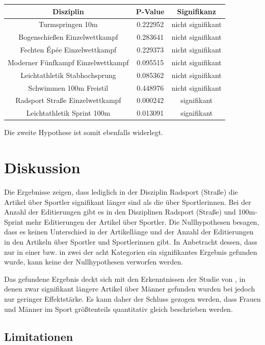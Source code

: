 \documentclass[11pt]{article}
\begin{document}
\begin{tabular}{ c|c|c }
  Disziplin & P-Value & Signifikanz \\
  \hline
  Turmspringen 10m & 0.222952 & nicht signifikant \\
  Bogenschießen Einzelwettkampf & 0.283641 & nicht signifikant \\
  Fechten Épée Einzelwettkampf & 0.229373 & nicht signifikant \\
  Moderner Fünfkampf Einzelwettkampf & 0.095515 & nicht signifikant \\
  Leichtathletik Stabhochsprung & 0.085362 & nicht signifikant \\
  Schwimmen 100m Freistil & 0.448976 & nicht signifikant \\
  Radsport Straße Einzelwettkampf & 0.000242 & signifikant \\
  Leichtathletik Sprint 100m & 0.013091 & signifikant \\
\end{tabular}

Die zweite Hypothese ist somit ebenfalls widerlegt. 


\section {Diskussion}

Die Ergebnisse zeigen, dass lediglich in der Disziplin Radsport (Straße) die Artikel über Sportler signifikant länger sind als die über Sportlerinnen. Bei der Anzahl der Editierungen gibt es in den Disziplinen Radsport (Straße) und 100m-Sprint mehr Editierungen der Artikel über Sportler. Die Nullhypothesen besagen, dass es keinen Unterschied in der Artikellänge und der Anzahl der Editierungen in den Artikeln über Sportler und Sportlerinnen gibt. In Anbetracht dessen, dass nur in einer bzw. in zwei der acht Kategorien ein signifikantes Ergebnis gefunden wurde, kann keine der Nullhypothesen verworfen werden.

Das gefundene Ergebnis deckt sich mit den Erkenntnissen der Studie von \textcite{GraellsGarrido2015}, in denen zwar signifikant längere Artikel über Männer gefunden wurden bei jedoch nur geringer Effektstärke. Es kann daher der Schluss gezogen werden, dass Frauen und Männer im Sport größtenteils quantitativ gleich beschrieben werden.

\subsection {Limitationen}
\end{document}
